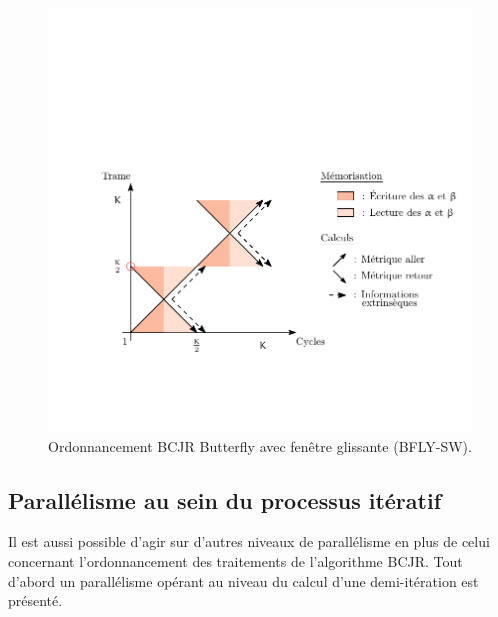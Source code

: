 \begin{figure}[!h]
	\centering
	\includegraphics{main/ch4_fig/ipe/BFLY_SW+LEG.pdf}
	\caption{Ordonnancement BCJR Butterfly avec fenêtre glissante (BFLY-SW). \label{fig:siso_bf_sw}}
	\vspace*{-1ex}
\end{figure}


\subsection{Parallélisme au sein du processus itératif}
Il est aussi possible d'agir sur d'autres niveaux de parallélisme en plus de celui concernant l'ordonnancement des traitements
de l'algorithme BCJR. Tout d'abord un 
parallélisme opérant au niveau du calcul d'une demi-itération est présenté.
